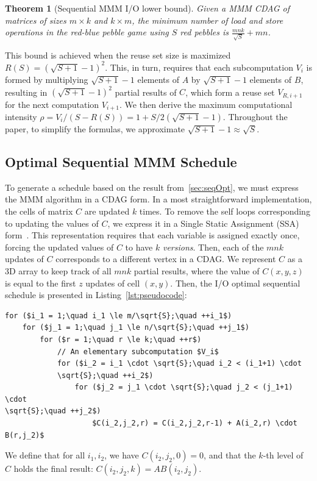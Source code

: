 \documentclass[sigplan,review,anonymous,10pt]{acmart}\settopmatter{printfolios=true,printccs=false,printacmref=false}
\newcommand\greg[1]{\textcolor{blue}{[Greg: #1]}}
\newcommand\mac[1]{\textcolor{red}{[Mac: #1]}}
\newtheorem{thm}{Theorem}
\begin{document}
\begin{thm}[Sequential MMM I/O lower bound] 
	Given a MMM CDAG of matrices of sizes $m \times k$ and $k \times m$,
	the minimum number of load and store operations in the red-blue pebble game 
	using $S$ red pebbles is $\frac{mnk}{\sqrt{S}} + mn$.
	\label{thm:seqlowbounds}
\end{thm}

This bound is achieved when the reuse set size is maximized $R(S) = (\sqrt{S + 
1} -1)^2$. This, in turn, requires that each subcomputation $V_i$ is formed by 
multiplying $\sqrt{S+1} -1$ elements of 
$A$ 
by $\sqrt{S+1} -1$ elements of $B$, resulting in $ (\sqrt{S + 1} -1)^2$ partial 
results of $C$, which form a reuse set $V_{R,i+1}$ for the next computation 
$V_{i+1}$.
 We then derive the maximum computational intensity 
$\rho = V_i/(S - R(S)) = 1 + S/2(\sqrt{S+1} - 1)$.
Throughout the paper, to simplify the formulas, we approximate $\sqrt{S + 1} -1 
\approx \sqrt{S}$.

\subsection{Optimal Sequential MMM Schedule} 
\label{sec:seqSched}
To generate a schedule based on the result from~\cref{sec:seqOpt}, we must 
express the MMM algorithm in a CDAG form. In a most straightforward 
implementation, the
cells of matrix $C$ are updated $k$ times. 
To remove the self loops corresponding to updating the values
of $C$, we express it in a Single Static Assignment (SSA) form~\cite{ssa}. This 
representation requires that each variable is assigned exactly once, forcing 
the updated values of $C$ to have $k$ \emph{versions}. Then, each of the $mnk$
updates of $C$ corresponds to a different vertex in a CDAG. We 
represent $C$ as a 3D array to keep track of all $mnk$ partial results, where 
the value of $C(x,y,z)$ is equal to the first $z$ updates of cell $(x,y)$.  
Then, the I/O optimal sequential schedule is presented in 
Listing~\ref{lst:pseudocode}:


\begin{lstlisting}[float=h, caption={Pseudocode of the I/O optimal sequential 
MMM in
the Single 
Static Assignment (SSA) form.},label=lst:pseudocode]
for ($i_1 = 1;\quad i_1 \le m/\sqrt{S};\quad ++i_1$) 
	for ($j_1 = 1;\quad j_1 \le n/\sqrt{S};\quad ++j_1$)
		for ($r = 1;\quad r \le k;\quad ++r$) 
			// An elementary subcomputation $V_i$
			for ($i_2 = i_1 \cdot \sqrt{S};\quad i_2 < (i_1+1) \cdot  
			\sqrt{S};\quad ++i_2$)
				for ($j_2 = j_1 \cdot \sqrt{S};\quad j_2 < (j_1+1) \cdot 
\sqrt{S};\quad ++j_2$)
					$C(i_2,j_2,r) = C(i_2,j_2,r-1) + A(i_2,r) \cdot B(r,j_2)$
\end{lstlisting}
\noindent
We define that for all $i_1,i_2$, we have $C(i_2,j_2,0) = 0$, and that the 
$k$-th level 
of $C$ holds the final result:  $C(i_2, j_2, k) = AB(i_2,j_2)$.
\end{document}
